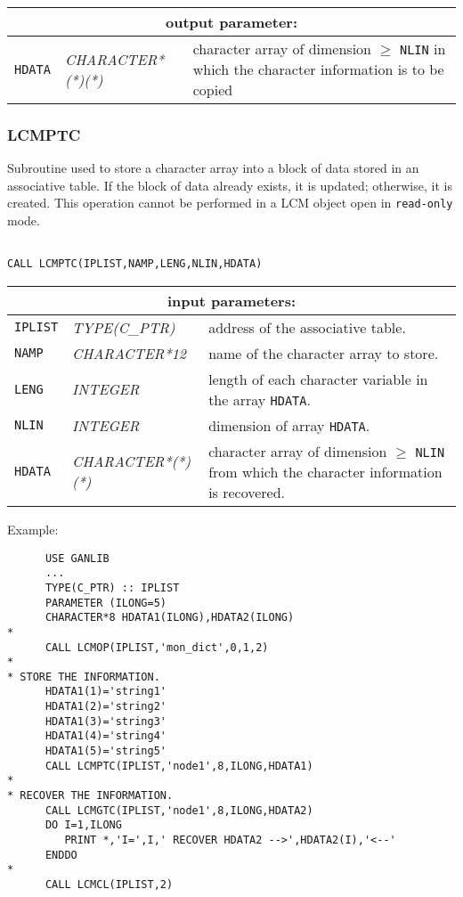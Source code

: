\vskip 0.8cm

\noindent
\begin{tabular}{|p{1.5cm}|p{3.5cm}|p{9.5cm}|}
\hline
\multicolumn{3}{|c|}{\bf output parameter:} \\
\hline
{\tt HDATA} & {\it CHARACTER*(*)(*)} & character array of dimension $\ge$ {\tt NLIN} in which the character information is to be copied \\
\hline
\end{tabular}

\subsubsection{LCMPTC}\label{sect:LCMPTC}

Subroutine used to store a character array into a block of data stored in an associative table.
If the block of data already exists, it is updated; otherwise, it is created. This operation cannot be performed
in a LCM object open in {\tt read-only} mode.

\begin{verbatim}

CALL LCMPTC(IPLIST,NAMP,LENG,NLIN,HDATA)
\end{verbatim}

\noindent
\begin{tabular}{|p{1.5cm}|p{3.5cm}|p{9.5cm}|}
\hline
\multicolumn{3}{|c|}{\bf input parameters:} \\
\hline
{\tt IPLIST} & {\it TYPE(C\_PTR)} & address of the associative table. \\
\hline
{\tt NAMP} & {\it CHARACTER*12} & name of the character array
to store. \\
\hline
{\tt LENG} & {\it INTEGER} & length of each character variable in the array {\tt HDATA}. \\
\hline
{\tt NLIN} & {\it INTEGER} & dimension of array {\tt HDATA}. \\
\hline
{\tt HDATA} & {\it CHARACTER*(*)(*)} & character array of dimension $\ge$ {\tt NLIN} from which the character information is recovered. \\
\hline
\end{tabular}

\vskip 0.4cm
\goodbreak

\noindent Example:
\begin{verbatim}
      USE GANLIB
      ...
      TYPE(C_PTR) :: IPLIST
      PARAMETER (ILONG=5)
      CHARACTER*8 HDATA1(ILONG),HDATA2(ILONG)
*
      CALL LCMOP(IPLIST,'mon_dict',0,1,2)
*
* STORE THE INFORMATION.
      HDATA1(1)='string1'
      HDATA1(2)='string2'
      HDATA1(3)='string3'
      HDATA1(4)='string4'
      HDATA1(5)='string5'
      CALL LCMPTC(IPLIST,'node1',8,ILONG,HDATA1)
*
* RECOVER THE INFORMATION.
      CALL LCMGTC(IPLIST,'node1',8,ILONG,HDATA2)
      DO I=1,ILONG
         PRINT *,'I=',I,' RECOVER HDATA2 -->',HDATA2(I),'<--'
      ENDDO
*
      CALL LCMCL(IPLIST,2)
\end{verbatim}

